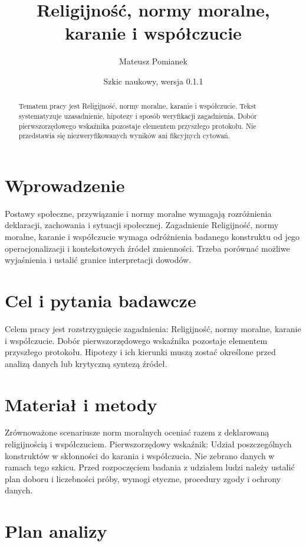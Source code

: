 \documentclass[11pt,a4paper]{article}
\title{Religijność, normy moralne, karanie i współczucie}
\author{Mateusz Pomianek}
\date{Szkic naukowy, wersja 0.1.1}
\begin{document}
\maketitle

\begin{abstract}

Tematem pracy jest Religijność, normy moralne, karanie i współczucie. Tekst systematyzuje uzasadnienie, hipotezy i sposób weryfikacji zagadnienia. Dobór pierwszorzędowego wskaźnika pozostaje elementem przyszłego protokołu. Nie przedstawia się niezweryfikowanych wyników ani fikcyjnych cytowań.

\end{abstract}

\section{Wprowadzenie}

Postawy społeczne, przywiązanie i normy moralne wymagają rozróżnienia deklaracji, zachowania i sytuacji społecznej. Zagadnienie Religijność, normy moralne, karanie i współczucie wymaga odróżnienia badanego konstruktu od jego operacjonalizacji i kontekstowych źródeł zmienności. Trzeba porównać możliwe wyjaśnienia i ustalić granice interpretacji dowodów.

\section{Cel i pytania badawcze}

Celem pracy jest rozstrzygnięcie zagadnienia: Religijność, normy moralne, karanie i współczucie. Dobór pierwszorzędowego wskaźnika pozostaje elementem przyszłego protokołu. Hipotezy i ich kierunki muszą zostać określone przed analizą danych lub krytyczną syntezą źródeł.

\section{Materiał i metody}

Zrównoważone scenariusze norm moralnych oceniać razem z deklarowaną religijnością i współczuciem. Pierwszorzędowy wskaźnik: Udział poszczególnych konstruktów w skłonności do karania i współczucia. Nie zebrano danych w ramach tego szkicu. Przed rozpoczęciem badania z udziałem ludzi należy ustalić plan doboru i liczebności próby, wymogi etyczne, procedury zgody i ochrony danych.

\section{Plan analizy}
\end{document}
